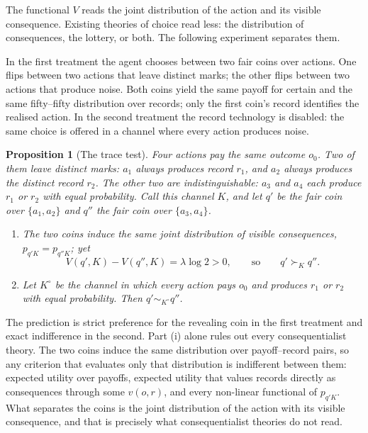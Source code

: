 \documentclass[11pt,a4paper]{article}
\newtheorem{proposition}[theorem]{Proposition}
\theoremstyle{definition}
\newcommand{\1}{\mathbf 1}
\begin{document}
The functional $V$ reads the joint distribution of the action and its visible consequence.  Existing theories of
choice read less: the distribution of consequences, the lottery, or both.  The following experiment separates
them.

In the first treatment the agent chooses between two fair coins over actions.  One flips between two actions
that leave distinct marks; the other flips between two actions that produce noise.  Both coins yield the same
payoff for certain and the same fifty--fifty distribution over records; only the first coin's record identifies
the realised action.  In the second treatment the record technology is disabled: the same choice is offered in a
channel where every action produces noise.

\begin{proposition}[The trace test]\label{prop:signature}
Four actions pay the same outcome $o_0$.  Two of them leave distinct marks: $a_1$ always produces record $r_1$,
and $a_2$ always produces the distinct record $r_2$.  The other two are indistinguishable: $a_3$ and $a_4$ each
produce $r_1$ or $r_2$ with equal probability.  Call this channel $K$, and let $q'$ be the fair coin over
$\{a_1,a_2\}$ and $q''$ the fair coin over $\{a_3,a_4\}$.
\begin{enumerate}[label=\textup{(\roman*)},leftmargin=*]
\item The two coins induce the same joint distribution of visible consequences, $p_{q'K}=p_{q''K}$; yet
\[
 V(q',K)-V(q'',K)=\lambda\log2>0,
 \qquad\text{so}\qquad
 q'\succ_Kq''.
\]
\item Let $K^\circ$ be the channel in which every action pays $o_0$ and produces $r_1$ or $r_2$ with equal
probability.  Then $q'\sim_{K^\circ}q''$.
\end{enumerate}
\end{proposition}

The prediction is strict preference for the revealing coin in the first treatment and exact indifference in the
second.  Part \textup{(i)} alone rules out every consequentialist theory.  The two coins induce the same
distribution over payoff--record pairs, so any criterion that evaluates only that distribution is indifferent
between them: expected utility over payoffs, expected utility that values records directly as consequences
through some $v(o,r)$, and every non-linear functional of $p_{q'K}$.  What separates the coins is the joint
distribution of the action with its visible consequence, and that is precisely what consequentialist theories do
not read.
\end{document}
